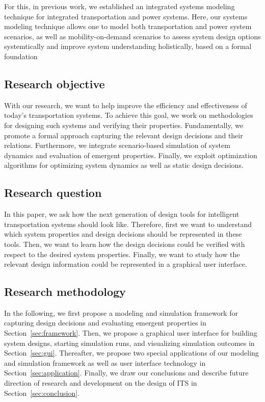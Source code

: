\documentclass[10pt,twocolumn]{article}
\begin{document}
For this, in previous work, we established an integrated systems modeling technique for integrated transportation and power systems. Here, our systems modeling technique allows one to model both transportation and power system scenarios, as well as mobility-on-demand scenarios to assess system design options systemtically and improve system understanding holistically, based on a formal foundation~\cite{ascher_hackenberg_2014,ascher_hackenberg_2015,ascher_hackenberg_2016,ascher_hackenberg_2017}




\subsection{Research objective}

With our research, we want to help improve the efficiency and effectiveness of today's transportation systems.
To achieve this goal, we work on methodologies for designing such systems and verifying their properties.
Fundamentally, we promote a formal approach capturing the relevant design decisions and their relations.
Furthermore, we integrate scenario-based simulation of system dynamics and evaluation of emergent properties.
Finally, we exploit optimization algorithms for optimizing system dynamics as well as static design decisions.

\subsection{Research question}

In this paper, we ask how the next generation of design tools for intelligent transportation systems should look like.
Therefore, first we want to understand which system properties and design decisions should be represented in these tools.
Then, we want to learn how the design decisions could be verified with respect to the desired system properties.
Finally, we want to study how the relevant design information could be represented in a graphical user interface.

\subsection{Research methodology}

In the following, we first propose a modeling and simulation framework for capturing design decisions and evaluating emergent properties in Section~\ref{sec:framework}.
Then, we propose a graphical user interface for building system designs, starting simulation runs, and visualizing simulation outcomes in Section~\ref{sec:gui}.
Thereafter, we propose two special applications of our modeling and simulation framework as well as user interface technology in Section~\ref{sec:application}.
Finally, we draw our conclusions and describe future direction of research and development on the design of ITS in Section~\ref{sec:conclusion}. 
\end{document}
